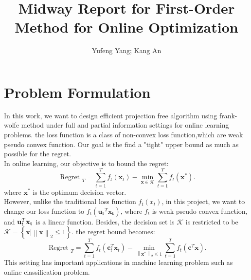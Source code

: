 \documentclass[12pt]{article}
\title{\vspace{2.5cm}Midway Report for First-Order Method for Online Optimization }
\author{Yufeng Yang; Kang An}
\begin{document}
\maketitle 
\section{Problem Formulation}
\label{PF}
In this work, we want to design efficient projection free algorithm using frank-wolfe method under full and partial information settings for online learning problems. the loss function is a class of non-convex loss function,which are weak pseudo convex function. Our goal is the find a "tight" upper bound as much as possible for the regret.\\
In online learning, our objective is to bound the regret:
\begin{equation}
    \text { Regret }_T=\sum_{t=1}^T f_t\left(\mathbf{x}_t\right)-\min _{\mathbf{x} \in \mathcal{K}} \sum_{t=1}^T f_t(\mathbf{x}^*) .
\end{equation}
where $\mathbf{x}^*$ is the optimum decision vector.\\
However, unlike the traditional loss function $f_t(x_t)$, in this project, we want to change our loss function to $f_t(\mathbf{u_t}^T \mathbf{x_t})$, where $f_t$ is weak pseudo convex function, and $\bold{u}_t^T\bold{x_t}$ is a linear function. Besides, the decision set is $\mathcal{K}$ is restricted to be $\mathcal{K} =\left \{ \mathbf{x}  | \left \| \mathbf{x} \right \|_2 \leq 1  \right \}$. 
the regret bound becomes:
\begin{equation}
    \text { Regret }_T=\sum_{t=1}^T f_t\left(\mathbf{c}_t^T\mathbf{x}_t\right)-\min _{\left \| \mathbf{x^*} \right \|_2 \leq 1} \sum_{t=1}^T f_t(\mathbf{c}^T\mathbf{x}).
\end{equation}
This setting has important applications in machine learning problem such as online classification problem.\\
\end{document}
